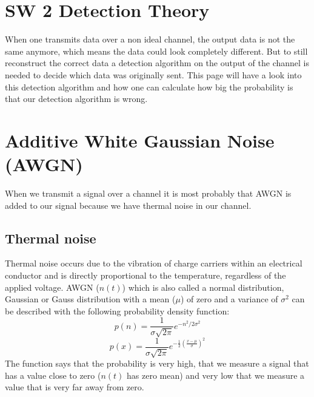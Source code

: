 \section{SW 2 Detection Theory}
When one transmits data over a non ideal channel, the output data is not the same anymore, which means the data could look completely different.  But to still reconstruct the correct data a detection algorithm on the output of the channel is needed to decide which data was originally sent. This page will have a look into this detection algorithm and how one can calculate how big the probability is that our detection algorithm is wrong.
\section{Additive White Gaussian Noise (AWGN)}
When we transmit a signal over a channel it is most probably that AWGN is added to our signal because we have thermal noise in our channel.
\subsection{Thermal noise}
Thermal noise occurs due to the vibration of charge carriers within an electrical conductor and is directly proportional to the temperature, regardless of the applied voltage.
AWGN ($n(t)$) which is also called a normal distribution, Gaussian or Gauss distribution with a mean ($\mu$) of zero and a variance of $\sigma^2$ can be described with the following probability density function:
\begin{equation}\label{eq:gauss_distribution_white noise}
p(n)=\frac{1}{\sigma \sqrt{2 \pi}} e^{-n^2 / 2 \sigma^2}
\end{equation}
\begin{equation}\label{eq:gauss_distribution}
p(x)=\frac{1}{\sigma \sqrt{2 \pi}} e^{-\frac{1}{2}(\frac{x-\mu}{\sigma})^2}
\end{equation}
The function says that the probability is very high, that we measure a signal that has a value close to zero ($n(t)$ has zero mean) and very low that we measure a value that is very far away from zero. 
